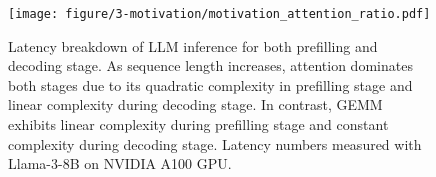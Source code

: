 
\begin{figure}
    \centering
    \texttt{[image: figure/3-motivation/motivation\_attention\_ratio.pdf]}
    \caption{
    Latency breakdown of LLM inference for both prefilling and decoding stage. As sequence length increases, attention dominates both stages due to its quadratic complexity in prefilling stage and linear complexity during decoding stage. In contrast, GEMM exhibits linear complexity during prefilling stage and constant complexity during decoding stage. Latency numbers measured with Llama-3-8B on NVIDIA A100 GPU.
    } \label{fig:motivation:attention_ratio}
\end{figure}

